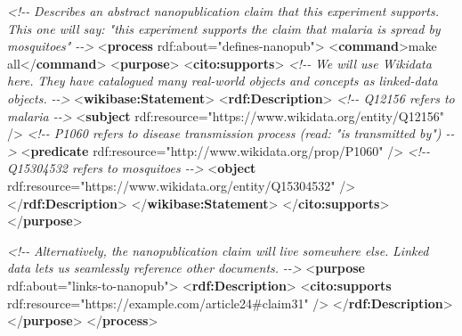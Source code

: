 \documentclass[manuscript]{acmart}
\newenvironment{Shaded}{}{}
\newcommand{\CommentTok}[1]{\textcolor[rgb]{0.38,0.63,0.69}{\textit{#1}}}
\newcommand{\KeywordTok}[1]{\textcolor[rgb]{0.00,0.44,0.13}{\textbf{#1}}}
\newcommand{\NormalTok}[1]{#1}
\newcommand{\OtherTok}[1]{\textcolor[rgb]{0.00,0.44,0.13}{#1}}
\newcommand{\StringTok}[1]{\textcolor[rgb]{0.25,0.44,0.63}{#1}}
\begin{document}
\begin{Shaded}
\begin{Highlighting}[]
  \CommentTok{\textless{}!{-}{-}}
\CommentTok{  Describes an abstract nanopublication claim that this experiment supports.}
\CommentTok{  This one will say: "this experiment supports the claim that malaria is spread by mosquitoes"}
\CommentTok{  {-}{-}\textgreater{}}
\NormalTok{  \textless{}}\KeywordTok{process}\OtherTok{ rdf:about=}\StringTok{"defines{-}nanopub"}\NormalTok{\textgreater{}}
\NormalTok{    \textless{}}\KeywordTok{command}\NormalTok{\textgreater{}make all\textless{}/}\KeywordTok{command}\NormalTok{\textgreater{}}
\NormalTok{    \textless{}}\KeywordTok{purpose}\NormalTok{\textgreater{}}
\NormalTok{      \textless{}}\KeywordTok{cito:supports}\NormalTok{\textgreater{}}
        \CommentTok{\textless{}!{-}{-}}
\CommentTok{        We will use Wikidata here.}
\CommentTok{        They have catalogued many real{-}world objects and concepts as linked{-}data objects.}
\CommentTok{        {-}{-}\textgreater{}}
\NormalTok{        \textless{}}\KeywordTok{wikibase:Statement}\NormalTok{\textgreater{}}
\NormalTok{          \textless{}}\KeywordTok{rdf:Description}\NormalTok{\textgreater{}}
            \CommentTok{\textless{}!{-}{-} Q12156 refers to malaria {-}{-}\textgreater{}}
\NormalTok{            \textless{}}\KeywordTok{subject}\OtherTok{ rdf:resource=}\StringTok{"https://www.wikidata.org/entity/Q12156"}\NormalTok{ /\textgreater{}}
            \CommentTok{\textless{}!{-}{-} P1060 refers to disease transmission process (read: "is transmitted by") {-}{-}\textgreater{}}
\NormalTok{            \textless{}}\KeywordTok{predicate}\OtherTok{ rdf:resource=}\StringTok{"http://www.wikidata.org/prop/P1060"}\NormalTok{ /\textgreater{}}
            \CommentTok{\textless{}!{-}{-} Q15304532 refers to mosquitoes {-}{-}\textgreater{}}
\NormalTok{            \textless{}}\KeywordTok{object}\OtherTok{ rdf:resource=}\StringTok{"https://www.wikidata.org/entity/Q15304532"}\NormalTok{ /\textgreater{}}
\NormalTok{          \textless{}/}\KeywordTok{rdf:Description}\NormalTok{\textgreater{}}
\NormalTok{        \textless{}/}\KeywordTok{wikibase:Statement}\NormalTok{\textgreater{}}
\NormalTok{      \textless{}/}\KeywordTok{cito:supports}\NormalTok{\textgreater{}}
\NormalTok{    \textless{}/}\KeywordTok{purpose}\NormalTok{\textgreater{}}

    \CommentTok{\textless{}!{-}{-}}
\CommentTok{    Alternatively, the nanopublication claim will live somewhere else.}
\CommentTok{    Linked data lets us seamlessly reference other documents.}
\CommentTok{    {-}{-}\textgreater{}}
\NormalTok{    \textless{}}\KeywordTok{purpose}\OtherTok{ rdf:about=}\StringTok{"links{-}to{-}nanopub"}\NormalTok{\textgreater{}}
\NormalTok{      \textless{}}\KeywordTok{rdf:Description}\NormalTok{\textgreater{}}
\NormalTok{        \textless{}}\KeywordTok{cito:supports}\OtherTok{ rdf:resource=}\StringTok{"https://example.com/article24\#claim31"}\NormalTok{ /\textgreater{}}
\NormalTok{      \textless{}/}\KeywordTok{rdf:Description}\NormalTok{\textgreater{}}
\NormalTok{    \textless{}/}\KeywordTok{purpose}\NormalTok{\textgreater{}}
\NormalTok{  \textless{}/}\KeywordTok{process}\NormalTok{\textgreater{}}


\end{Highlighting}
\end{Shaded}
\end{document}
